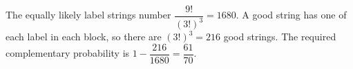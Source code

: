 The equally likely label strings number $\dfrac{9!}{(3!)^3}=1680$. A good string has one of each label in each block, so there are $(3!)^3=216$ good strings. The required complementary probability is $1-\dfrac{216}{1680}=\boxed{\dfrac{61}{70}}$.
